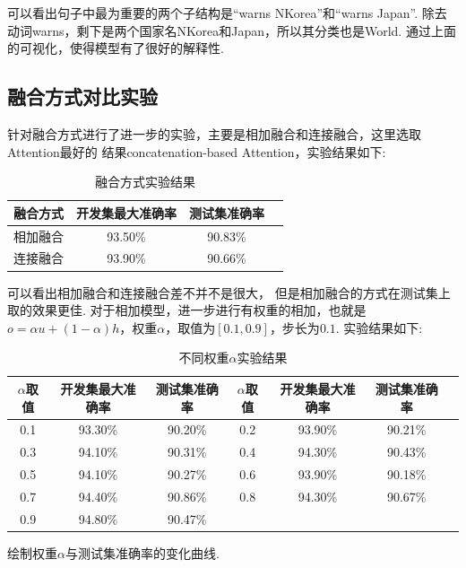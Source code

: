 \documentclass[bachelor,adobefonts]{jnuthesis}
\begin{document}
可以看出句子中最为重要的两个子结构是“warns NKorea”和“warns Japan”.
除去动词warns，剩下是两个国家名NKorea和Japan，所以其分类也是World.
通过上面的可视化，使得模型有了很好的解释性.

\subsection{融合方式对比实验}
针对融合方式进行了进一步的实验，主要是相加融合和连接融合，这里选取Attention最好的
结果concatenation-based Attention，实验结果如下:

\begin{table}[h!]
  \centering
  \begin{tabular}{cccc}
    \toprule
    \textbf{融合方式} & \textbf{开发集最大准确率} & \textbf{测试集准确率} \\
    \midrule
    相加融合 & 93.50\% & 90.83\% \\
    连接融合 & 93.90\% & 90.66\% \\
    \bottomrule
  \end{tabular}
  \caption{融合方式实验结果}
\end{table}

可以看出相加融合和连接融合差不并不是很大，
但是相加融合的方式在测试集上取的效果更佳.
对于相加模型，进一步进行有权重的相加，也就是$o = \alpha u + (1-\alpha)h$，权重$\alpha$，取值为$[0.1,0.9]$，步长为$0.1$.
实验结果如下:
\begin{table}[h!]
  \centering
  \begin{tabular}{ccccccc}
    \toprule
    \textbf{$\alpha$取值} & \textbf{开发集最大准确率} & \textbf{测试集准确率} & \textbf{$\alpha$取值} & \textbf{开发集最大准确率} & \textbf{测试集准确率} \\
    \midrule
    0.1 & 93.30\% & 90.20\% & 0.2 & 93.90\% & 90.21\%\\
    0.3 & 94.10\% & 90.31\% & 0.4 & 94.30\% & 90.43\%\\
    0.5 & 94.10\% & 90.27\% & 0.6 & 93.90\% & 90.18\%\\
    0.7 & 94.40\% & 90.86\% & 0.8 & 94.30\% & 90.67\% \\
    0.9 & 94.80\% & 90.47\% &&&\\
    \bottomrule
  \end{tabular}
  \caption{不同权重$\alpha$实验结果}
\end{table}

绘制权重$\alpha$与测试集准确率的变化曲线.

\end{document}
